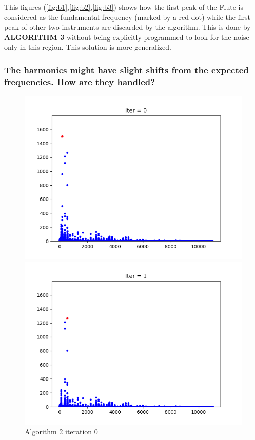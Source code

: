 \documentclass{article}
\begin{document}
This figures (\ref{fig:b1},\ref{fig:b2},\ref{fig:b3}) shows how the first peak of the Flute is considered as the fundamental frequency (marked by a red dot) while the first peak of other two instruments are discarded by the algorithm. This is done by \textbf{ALGORITHM 3} without being explicitly programmed to look for the noise only in this region. This solution is more generalized.


\subsubsection{The harmonics might have slight shifts from the expected frequencies. How are they handled?}


\begin{figure}[!htbp]
  \includegraphics[width=\linewidth]{partial-finding-00.png}
  \caption{Algorithm 2 iteration 0}\label{fig:c1}
\endminipage\hfill
{}
  \includegraphics[width=\linewidth]{partial-finding-01.png}

\end{figure}
\end{document}
